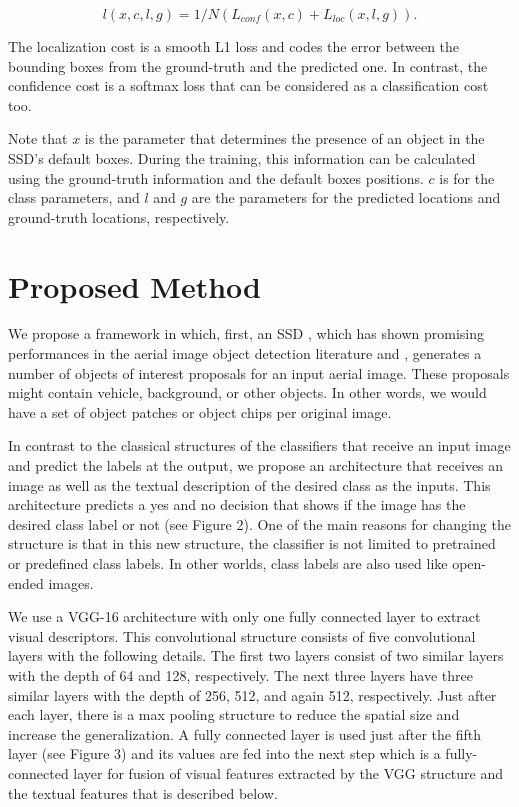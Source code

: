 \documentclass[conference]{IEEEtran}
\begin{document}
\begin{equation}
l(x,c,l,g)=1/N(L_{conf}(x,c)+{L_{loc}(x,l,g)}).
\end{equation}

The localization cost is a smooth L1 loss and codes the error between the bounding boxes from the ground-truth and the predicted one. In contrast, the confidence cost is a softmax loss that can be considered as a classification cost too. 

Note that $x$ is the parameter that determines the presence of an object in the SSD's default boxes. During the training, this information can be calculated using the ground-truth information and the default boxes positions. $c$ is for the class parameters, and $l$ and $g$ are the parameters for the predicted locations and ground-truth locations, respectively.\\


\section{Proposed Method}

We propose a framework in which, first, an SSD \cite{ssd}, which has shown promising performances in the aerial image object detection literature \cite{fusion} and \cite{okutama}, generates a number of objects of interest proposals for an input aerial image. These proposals might contain vehicle, background, or other objects. In other words, we would have a set of object patches or object chips per original image.

In contrast to the classical structures of the classifiers that receive an input image and predict the labels at the output, we propose an architecture that receives an image as well as the textual description of the desired class as the inputs. This architecture predicts a yes and no decision that shows if the image has the desired class label or not (see Figure 2). One of the main reasons for changing the structure is that in this new structure, the classifier is not limited to pretrained or predefined class labels. In other worlds, class labels are also used like open-ended images.

We use a VGG-16 architecture \cite{vgg} with only one fully connected layer to extract visual descriptors. This convolutional structure consists of five convolutional layers with the following details. The first two layers consist of two similar layers with the depth of 64 and 128, respectively. The next three layers have three similar layers with the depth of 256, 512, and again 512, respectively. Just after each layer, there is a max pooling structure to reduce the spatial size and increase the generalization. A fully connected layer is used just after the fifth layer (see Figure 3) and its values are fed into the next step which is a fully-connected layer for fusion of visual features extracted by the VGG structure and the textual features that is described below.
\end{document}
